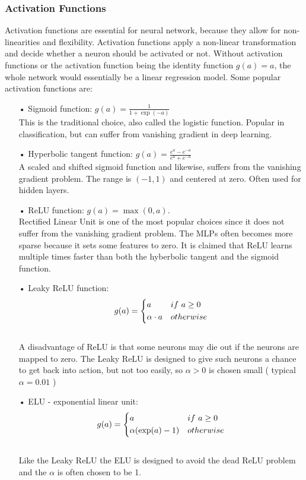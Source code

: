 \subsubsection{Activation Functions}
Activation functions are essential for neural network, because they allow for non-linearities and flexibility. Activation functions apply a non-linear transformation and decide whether a neuron should be activated or not. Without activation functions or the activation function being the identity function $g(a)=a$, the whole network would essentially be a linear regression model. Some popular activation functions are:
\begin{enumerate}
\item[•] Sigmoid function: $g(a)=\frac{1}{1+\exp(-a)}$\\

This is the traditional choice, also called the logistic function. Popular in classification, but can suffer from vanishing gradient in deep learning.
\item[•] Hyperbolic tangent function: $g(a)=\frac{e^a-e^{-a}}{e^a+e^{-a}}$\\

A scaled and shifted sigmoid function and likewise, suffers from the vanishing gradient problem. The range is $(-1,1)$ and centered at zero. Often used for hidden layers.
\item[•] ReLU function: $g(a)=\max(0,a)$.\\

Rectified Linear Unit is one of the most popular choices since it does not suffer from the vanishing gradient problem. The MLPs often becomes more sparse because it sets some features to zero. It is claimed that ReLU learns multiple times faster than both the hyberbolic tangent and the sigmoid function.
\item[•] Leaky ReLU function:  \[ g(a)=
    \begin{dcases}
        a & if \ a \geq 0 \\
        \alpha \cdot a & otherwise \\
    \end{dcases}
\]\\
A disadvantage of ReLU is that some neurons may die out if the neurons are mapped to zero. The Leaky ReLU is designed to give such neurons a chance to get back into action, but not too easily, so $\alpha>0$ is chosen small ( typical $\alpha=0.01$ ) 

\item[•] ELU - exponential linear unit:  \[ g(a)=
    \begin{dcases}
        a & if \ a \geq 0 \\
        \alpha(\exp(a)-1) & otherwise \\
    \end{dcases}
\]\\
Like the Leaky ReLU the ELU is designed to avoid the dead ReLU problem and the $\alpha$ is often chosen to be 1. 
\end{enumerate}

